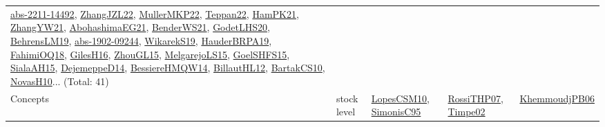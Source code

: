 {\begin{longtable}{lp{3cm}>{\raggedright}p{6cm}>{\raggedright}p{6cm}p{8cm}}
\href{articles/abs-2211-14492.pdf}{abs-2211-14492}\cite{abs-2211-14492}, \href{papers/ZhangJZL22.pdf}{ZhangJZL22}\cite{ZhangJZL22}, \href{articles/MullerMKP22.pdf}{MullerMKP22}\cite{MullerMKP22}, \href{papers/Teppan22.pdf}{Teppan22}\cite{Teppan22}, \href{articles/HamPK21.pdf}{HamPK21}\cite{HamPK21}, \href{articles/ZhangYW21.pdf}{ZhangYW21}\cite{ZhangYW21}, \href{articles/AbohashimaEG21.pdf}{AbohashimaEG21}\cite{AbohashimaEG21}, \href{papers/BenderWS21.pdf}{BenderWS21}\cite{BenderWS21}, \href{papers/GodetLHS20.pdf}{GodetLHS20}\cite{GodetLHS20}, \href{papers/BehrensLM19.pdf}{BehrensLM19}\cite{BehrensLM19}, \href{articles/abs-1902-09244.pdf}{abs-1902-09244}\cite{abs-1902-09244}, \href{articles/WikarekS19.pdf}{WikarekS19}\cite{WikarekS19}, \href{articles/HauderBRPA19.pdf}{HauderBRPA19}\cite{HauderBRPA19}, \href{articles/FahimiOQ18.pdf}{FahimiOQ18}\cite{FahimiOQ18}, \href{papers/GilesH16.pdf}{GilesH16}\cite{GilesH16}, \href{papers/ZhouGL15.pdf}{ZhouGL15}\cite{ZhouGL15}, \href{papers/MelgarejoLS15.pdf}{MelgarejoLS15}\cite{MelgarejoLS15}, \href{articles/GoelSHFS15.pdf}{GoelSHFS15}\cite{GoelSHFS15}, \href{papers/SialaAH15.pdf}{SialaAH15}\cite{SialaAH15}, \href{papers/DejemeppeD14.pdf}{DejemeppeD14}\cite{DejemeppeD14}, \href{papers/BessiereHMQW14.pdf}{BessiereHMQW14}\cite{BessiereHMQW14}, \href{papers/BillautHL12.pdf}{BillautHL12}\cite{BillautHL12}, \href{articles/BartakCS10.pdf}{BartakCS10}\cite{BartakCS10}, \href{articles/NovasH10.pdf}{NovasH10}\cite{NovasH10}... (Total: 41)\\
Concepts & stock level & \href{articles/LopesCSM10.pdf}{LopesCSM10}\cite{LopesCSM10}, \href{papers/SimonisC95.pdf}{SimonisC95}\cite{SimonisC95} & \href{papers/RossiTHP07.pdf}{RossiTHP07}\cite{RossiTHP07}, \href{articles/Timpe02.pdf}{Timpe02}\cite{Timpe02} & \href{papers/KhemmoudjPB06.pdf}{KhemmoudjPB06}\cite{KhemmoudjPB06}\\

\end{longtable}}
